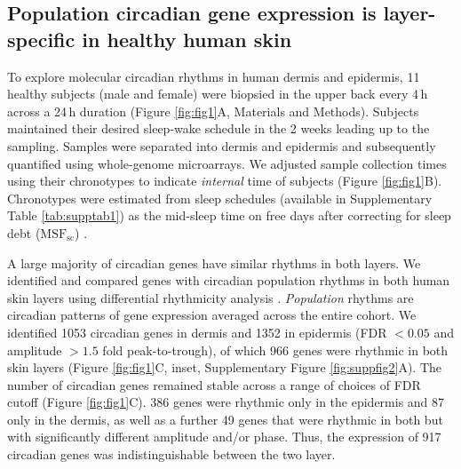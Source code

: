 \subsection*{Population circadian gene expression is layer-specific in healthy human skin} 
To explore molecular circadian rhythms in human dermis and epidermis, 11 healthy subjects (male and female) were biopsied in the upper back every 4\,h across a 24\,h duration (Figure \ref{fig:fig1}A, Materials and Methods). Subjects maintained their desired sleep-wake schedule in the 2 weeks leading up to the sampling. Samples were separated into dermis and epidermis and subsequently quantified using whole-genome microarrays. We adjusted sample collection times using their chronotypes to indicate \emph{internal} time of subjects (Figure \ref{fig:fig1}B). Chronotypes were estimated from sleep schedules (available in Supplementary Table \ref{tab:supptab1}) as the mid-sleep time on free days after correcting for sleep debt ($\textrm{MSF}_\textrm{sc}$) \cite{Vetter2021}. 

A large majority of circadian genes have similar rhythms in both layers. We identified and compared genes with circadian population rhythms in both human skin layers using differential rhythmicity analysis \cite{Pelikan2021}. \textit{Population} rhythms are circadian patterns of gene expression averaged across the entire cohort. We identified 1053 circadian genes in dermis and 1352 in epidermis (FDR $<0.05$ and amplitude $>1.5$ fold peak-to-trough), of which 966 genes were rhythmic in both skin layers (Figure \ref{fig:fig1}C, inset, Supplementary Figure \ref{fig:suppfig2}A). The number of circadian genes remained stable across a range of choices of FDR cutoff (Figure \ref{fig:fig1}C). 386 genes were rhythmic only in the epidermis and 87 only in the dermis, as well as a further 49 genes that were rhythmic in both but with significantly different amplitude and/or phase. Thus, the expression of 917 circadian genes was indistinguishable between the two layer.

